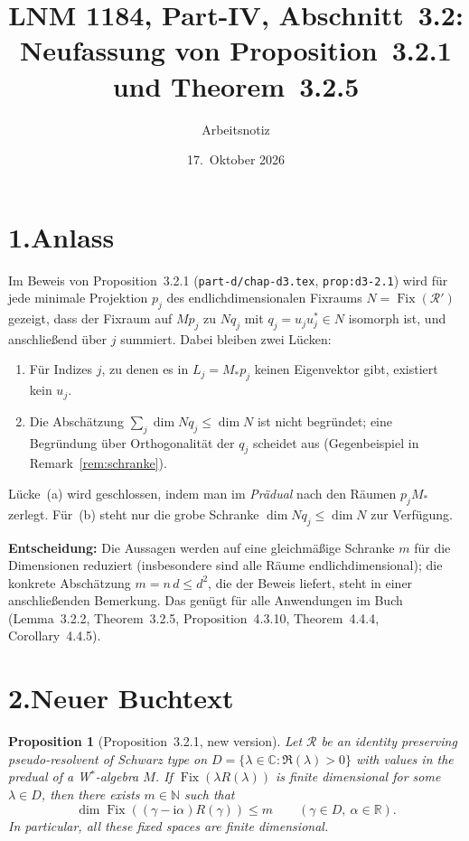 \documentclass[11pt,a4paper]{article}
\title{LNM 1184, Part-IV, Abschnitt~3.2:\\ Neufassung von Proposition~3.2.1 und Theorem~3.2.5}
\author{Arbeitsnotiz}
\date{17.~Oktober 2026}
\newtheorem{proposition}{Proposition}
\theoremstyle{remark}
\newcommand{\R}{\mathbb{R}}
\newcommand{\C}{\mathbb{C}}
\newcommand{\N}{\mathbb{N}}
\newcommand{\im}{\mathrm{i}}
\newcommand{\1}{\mathbf{1}}
\newcommand{\RR}{\mathcal{R}}
\newcommand{\Fix}[1]{\operatorname{Fix}(#1)}
\newcommand{\WA}{W$^{*}$}
\begin{document}
\maketitle

\section*{1.\quad Anlass}

Im Beweis von Proposition~3.2.1 (\texttt{part-d/chap-d3.tex}, \texttt{prop:d3-2.1}) wird für jede minimale Projektion $p_j$ des endlichdimensionalen Fixraums $N = \Fix{\RR'}$ gezeigt, dass der Fixraum auf $Mp_j$ zu $Nq_j$ mit $q_j = u_ju_j^{*} \in N$ isomorph ist, und anschließend über $j$ summiert.
Dabei bleiben zwei Lücken:
\begin{enumerate}[label=(\alph*)]
\item Für Indizes $j$, zu denen es in $L_j = M_*p_j$ keinen Eigenvektor gibt, existiert kein $u_j$.
\item Die Abschätzung $\sum_j \dim Nq_j \le \dim N$ ist nicht begründet; eine Begründung über Orthogonalität der $q_j$ scheidet aus (Gegenbeispiel in Remark~\ref{rem:schranke}).
\end{enumerate}
Lücke~(a) wird geschlossen, indem man im \emph{Prädual} nach den Räumen $p_jM_*$ zerlegt.
Für~(b) steht nur die grobe Schranke $\dim Nq_j \le \dim N$ zur Verfügung.

\textbf{Entscheidung:} Die Aussagen werden auf eine gleichmäßige Schranke $m$ für die Dimensionen reduziert (insbesondere sind alle Räume endlichdimensional); die konkrete Abschätzung $m = n\,d \le d^{2}$, die der Beweis liefert, steht in einer anschließenden Bemerkung.
Das genügt für alle Anwendungen im Buch (Lemma~3.2.2, Theorem~3.2.5, Proposition~4.3.10, Theorem~4.4.4, Corollary~4.4.5).

\section*{2.\quad Neuer Buchtext}


\begin{proposition}[Proposition~3.2.1, new version]\label{prop:neu}
Let $\RR$ be an identity preserving pseudo-resolvent of Schwarz type on $D = \{\lambda \in \C \colon \Re(\lambda) > 0\}$ with values in the predual of a \WA-algebra $M$.
If\/ $\Fix{\lambda R(\lambda)}$ is finite dimensional for some $\lambda \in D$, then there exists $m \in \N$ such that
\[
  \dim \Fix{(\gamma - \im\alpha)R(\gamma)} \le m \qquad (\gamma \in D,\ \alpha \in \R).
\]
In particular, all these fixed spaces are finite dimensional.
\end{proposition}
\end{document}
